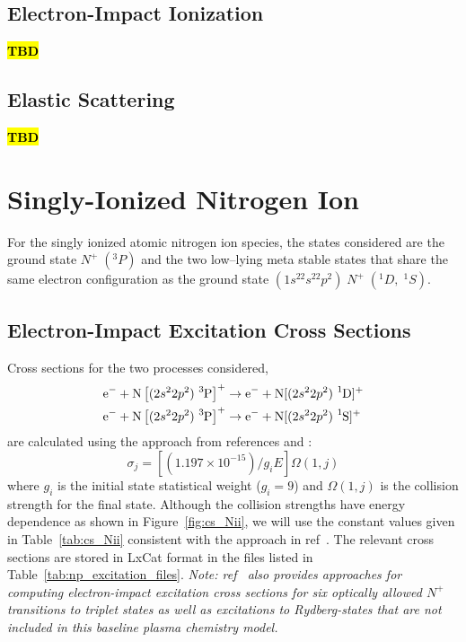 \documentclass[12pt]{article}
\newcommand{\tbd}{\textcolor{red}{\textbf{\hl{TBD}}}}
\begin{document}
\subsection{Electron-Impact Ionization} 
\tbd

\subsection{Elastic Scattering}
\tbd

\section{Singly-Ionized Nitrogen Ion}

For the singly ionized atomic nitrogen ion species, the states
considered are the ground state $N^+\;(^3P)$ and the two low–lying
meta stable states that share the same electron configuration as
the ground state $(1s^22s^22p^2)\; N^+\; (^1D,\; ^1S)$. 

\subsection{Electron-Impact Excitation Cross Sections}
Cross sections for the two processes considered,
\begin{align}
		\ce{e-} + \ce{N}\left[(2s^22p^2)\; \ce{^3P}\right]^+ & \rightarrow \ce{e-} +\ce{N}[(2s^22p^2)\; \ce{^1D}]^+\\
		\ce{e-} + \ce{N}\left[(2s^22p^2)\; \ce{^3P}\right]^+ & \rightarrow \ce{e-} +\ce{N}[(2s^22p^2)\; \ce{^1S}]^+
\end{align}
are calculated using the approach from references \cite{henry1969} and \cite{taylor1988}:
\begin{equation}
		\sigma_j = \left[\left(1.197\times 10^{-15}\right)/g_i E\right]\Omega(1,j)
\end{equation}
where $g_i$ is the initial state statistical weight ($g_i = 9$) and $\Omega(1,j)$
is the collision strength for the final state. Although the collision strengths have
energy dependence as shown in Figure~\ref{fig:cs_Nii}, we will use the 
constant values given in Table~\ref{tab:cs_Nii} consistent with the approach in ref~\cite{henry1969}.
The relevant cross sections are stored in LxCat format in the files listed in 
Table~\ref{tab:np_excitation_files}.
\textit{Note: ref~\cite{taylor1988} also provides approaches for computing electron-impact
excitation cross sections for six optically allowed $N^+$ transitions to triplet
states as well as excitations to Rydberg-states that are not included in this baseline
plasma chemistry model.}
\end{document}
